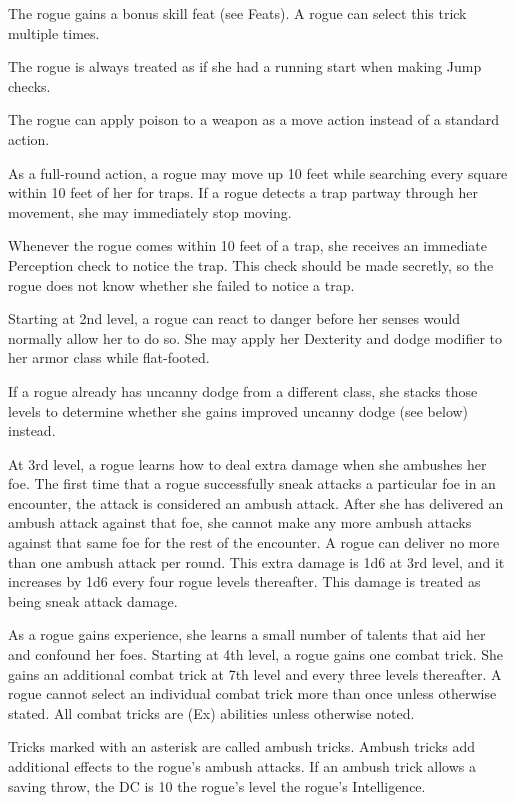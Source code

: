  The rogue gains a bonus skill feat (see Feats). A rogue can select this trick multiple times.

 The rogue is always treated as if she had a running start when making Jump checks.

 The rogue can apply poison to a weapon as a move action instead of a standard action.

 As a full-round action, a rogue may move up 10 feet while searching every square within 10 feet of her for traps. If a rogue detects a trap partway through her movement, she may immediately stop moving.

 Whenever the rogue comes within 10 feet of a trap, she receives an immediate Perception check to notice the trap. This check should be made secretly, so the rogue does not know whether she failed to notice a trap.

 Starting at 2nd level, a rogue can react to danger before her senses would normally allow her to do so. She may apply her Dexterity and dodge modifier to her armor class while flat-footed.

If a rogue already has uncanny dodge from a different class, she stacks those levels to determine whether she gains improved uncanny dodge (see below) instead.

 At 3rd level, a rogue learns how to deal extra damage when she ambushes her foe. The first time that a rogue successfully sneak attacks a particular foe in an encounter, the attack is considered an ambush attack. After she has delivered an ambush attack against that foe, she cannot make any more ambush attacks against that same foe for the rest of the encounter. A rogue can deliver no more than one ambush attack per round. This extra damage is 1d6 at 3rd level, and it increases by 1d6 every four rogue levels thereafter. This damage is treated as being sneak attack damage.

 As a rogue gains experience, she learns a small number of talents that aid her and confound her foes. Starting at 4th level, a rogue gains one combat trick. She gains an additional combat trick at 7th level and every three levels thereafter. A rogue cannot select an individual combat trick more than once unless otherwise stated. All combat tricks are (Ex) abilities unless otherwise noted.

\par Tricks marked with an asterisk are called ambush tricks. Ambush tricks add additional effects to the rogue's ambush attacks. If an ambush trick allows a saving throw, the DC is 10 \add the rogue's level \add the rogue's Intelligence.

